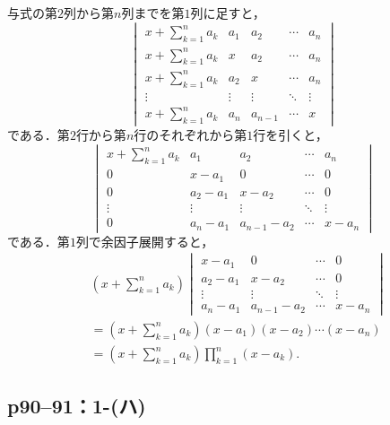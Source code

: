 \begin{tanswer}
  与式の第$2$列から第$n$列までを第$1$列に足すと，
  \[
    \begin{vmatrix}
      x+\sum_{k=1}^{n} a_k & a_1    & a_2     & \cdots & a_n    \\
      x+\sum_{k=1}^{n} a_k & x      & a_2     & \cdots & a_n    \\
      x+\sum_{k=1}^{n} a_k & a_2    & x       & \cdots & a_n    \\
      \vdots               & \vdots & \vdots  & \ddots & \vdots \\
      x+\sum_{k=1}^{n} a_k & a_n    & a_{n-1} & \cdots & x
    \end{vmatrix}
  \]
  である．第$2$行から第$n$行のそれぞれから第$1$行を引くと，
  \[
    \begin{vmatrix}
      x+\sum_{k=1}^{n} a_k & a_1      & a_2         & \cdots & a_n    \\
      0                    & x-a_1    & 0           & \cdots & 0      \\
      0                    & a_2 -a_1 & x-a_2       & \cdots & 0      \\
      \vdots               & \vdots   & \vdots      & \ddots & \vdots \\
      0                    & a_n-a_1  & a_{n-1}-a_2 & \cdots & x-a_n
    \end{vmatrix}
  \]
  である．第$1$列で余因子展開すると，
  \begin{align*}
     &
    (x+\sum_{k=1}^{n} a_k)
    \begin{vmatrix}
      x-a_1    & 0           & \cdots & 0      \\
      a_2 -a_1 & x-a_2       & \cdots & 0      \\
      \vdots   & \vdots      & \ddots & \vdots \\
      a_n-a_1  & a_{n-1}-a_2 & \cdots & x-a_n
    \end{vmatrix}
    \\
     & = (x+\sum_{k=1}^{n} a_k) (x-a_1)(x-a_2) \dotsm (x-a_n) \\
     & = (x+\sum_{k=1}^{n} a_k) \prod_{k=1}^{n} (x-a_k).
  \end{align*}
\end{tanswer}


\subsection*{p90--91：1-(ハ)}

